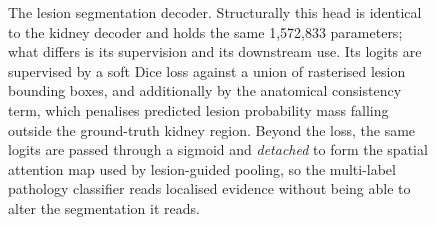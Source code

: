 \begin{figure}[htbp]
{\begin{tikzpicture}
\end{tikzpicture}}
\caption{The lesion segmentation decoder. Structurally this head is identical to the kidney decoder and holds the same 1,572,833 parameters; what differs is its supervision and its downstream use. Its logits are supervised by a soft Dice loss against a union of rasterised lesion bounding boxes, and additionally by the anatomical consistency term, which penalises predicted lesion probability mass falling outside the ground-truth kidney region. Beyond the loss, the same logits are passed through a sigmoid and \emph{detached} to form the spatial attention map used by lesion-guided pooling, so the multi-label pathology classifier reads localised evidence without being able to alter the segmentation it reads.}\label{fig:lesion-decoder}
\end{figure}


